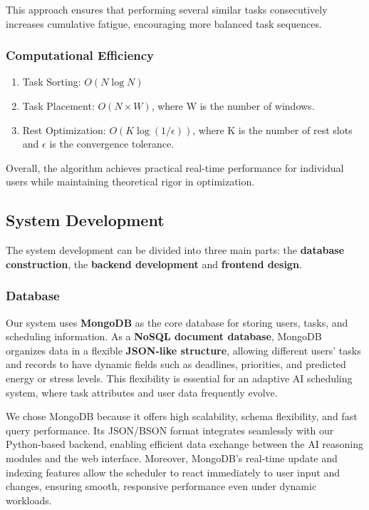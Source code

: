 \documentclass[12pt, a4paper]{article}
\begin{document}
            This approach ensures that performing several similar tasks consecutively increases cumulative fatigue, encouraging more balanced task sequences.

        
        \subsubsection{Computational Efficiency}

            \begin{enumerate}
                \item Task Sorting: $O(N \log N)$
                \item Task Placement: $O(N \times W)$, where W is the number of windows.
                \item Rest Optimization: $O(K \log(1/\epsilon))$, where K is the number of rest slots and $\epsilon$ is the convergence tolerance.
            \end{enumerate}

            Overall, the algorithm achieves practical real-time performance for individual users while maintaining theoretical rigor in optimization.


    \subsection{System Development}
    
        The system development can be divided into three main parts: the \textbf{database construction}, the \textbf{backend development} and \textbf{frontend design}. 

        \subsubsection{Database}

            Our system uses \textbf{MongoDB} as the core database for storing users, tasks, and scheduling information. As a \textbf{NoSQL document database}, MongoDB organizes data in a flexible \textbf{JSON-like structure}, allowing different users’ tasks and records to have dynamic fields such as deadlines, priorities, and predicted energy or stress levels. This flexibility is essential for an adaptive AI scheduling system, where task attributes and user data frequently evolve.
            
            We chose MongoDB because it offers high scalability, schema flexibility, and fast query performance. Its JSON/BSON format integrates seamlessly with our Python-based backend, enabling efficient data exchange between the AI reasoning modules and the web interface. Moreover, MongoDB’s real-time update and indexing features allow the scheduler to react immediately to user input and changes, ensuring smooth, responsive performance even under dynamic workloads.
\end{document}
